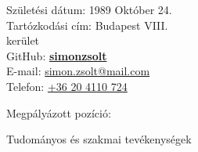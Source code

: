 Születési dátum: 1989 Október 24.\\
Tartózkodási cím: Budapest VIII.\\ \hspace*{1em} kerület\\ 
GitHub: \href{https://github.com/simonzsolt}{\textbf{simonzsolt}}\\
E-mail: \href{mailto:simon.zsolt@mail.com}{simon.zsolt@mail.com}\\
Telefon: \href{tel:0036204110724}{+36 20 4110 724}

\vspace{1em}

Megpályázott pozíció: \position

\vspace{1em}

Tudományos és szakmai tevékenységek

